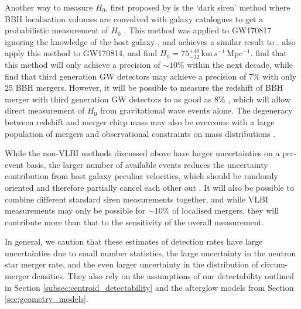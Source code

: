 Another way to measure $H_0$, first proposed by \citet{1986Natur.323..310S} is the `dark siren' method where BBH localisation volumes are convolved with galaxy catalogues to get a probabilistic measurement of $H_0$ \citep{2012PhRvD..86d3011D}. This method was applied to GW170817 ignoring the knowledge of the host galaxy \citep{2019ApJ...871L..13F}, and achieves a similar result to \citet{2017Natur.551...85A}. \citet{2019ApJ...876L...7S} also apply this method to GW170814, and find $H_0 = 75_{-32}^{+40}$\,km\,$s^{-1}$\,Mpc$^{-1}$. \citet{2018Natur.562..545C} find that this method will only achieve a precision of $\sim 10\%$ within the next decade, while \citet{2018PhRvD..98b3502N} find that third generation GW detectors may achieve a precision of 7\% with only 25 BBH mergers. However, it will be possible to measure the redshift of BBH merger with third generation GW detectors to as good as 8\% \citep{2012PhRvL.108i1101M}, which will allow direct measurement of $H_0$ from gravitational wave events alone. The degeneracy between redshift and merger chirp mass may also be overcome with a large population of mergers and observational constraints on mass distributions \citep{2012PhRvD..85b3535T,2019ApJ...883L..42F}.

While the non-VLBI methods discussed above have larger uncertainties on a per-event basis, the larger number of available events reduces the uncertainty contribution from host galaxy peculiar velocities, which should be randomly oriented and therefore partially cancel each other out \citep{2020MNRAS.492.3803H}. It will also be possible to combine different standard siren measurements together, and while VLBI measurements may only be possible for $\sim 10\%$ of localised mergers, they will contribute more than that to the sensitivity of the overall measurement.

In general, we caution that these estimates of detection rates have large uncertainties due to small number statistics, the large uncertainty in the neutron star merger rate, and the even larger uncertainty in the distribution of circum-merger densities. They also rely on the assumptions of our detectability outlined in Section \ref{subsec:centroid_detectability} and the afterglow models from Section \ref{sec:geometry_models}. 




